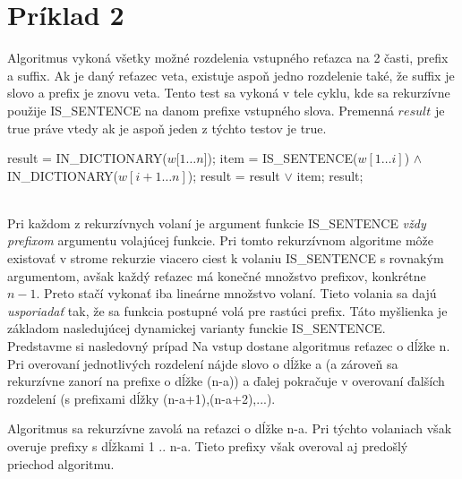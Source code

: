 \documentclass[paper=a4, fontsize=11pt]{scrartcl} %
\numberwithin{equation}{section} %
\numberwithin{figure}{section} %
\numberwithin{table}{section} %
\begin{document}
\pagebreak


\section*{Príklad 2}

Algoritmus vykoná všetky možné rozdelenia vstupného reťazca na 2 časti, prefix a suffix.
Ak je daný reťazec veta, existuje aspoň jedno rozdelenie také, že suffix je slovo a prefix je znovu veta.
Tento test sa vykoná v tele cyklu, kde sa rekurzívne použije IS\_SENTENCE na danom prefixe vstupného slova.
Premenná $result$ je true práve vtedy ak je aspoň jeden z týchto testov je true.

\begin{algorithmic}[1]
        \State result = IN\_DICTIONARY($w[1 \dots n$]);
        	\State item = IS\_SENTENCE($w[1 \dots i]$) $\wedge$ IN\_DICTIONARY($w[i + 1 \dots n]$);
		\State result = result $\vee$ item;
        \EndFor
        \State \Return result;
    \EndFunction
\end{algorithmic}
\ \\

Pri každom z rekurzívnych volaní je argument funkcie IS\_SENTENCE {\em vždy prefixom} argumentu volajúcej funkcie.
Pri tomto rekurzívnom algoritme môže existovať v strome rekurzie viacero ciest k volaniu IS\_SENTENCE s rovnakým argumentom, avšak každý reťazec má konečné množstvo prefixov, konkrétne $n - 1$.
Preto stačí vykonať iba lineárne množstvo volaní.
Tieto volania sa dajú {\em usporiadať} tak, že sa funkcia postupné volá pre rastúci prefix. 
Táto myšlienka je základom nasledujúcej dynamickej varianty funckie IS\_SENTENCE.\\

Predstavme si nasledovný prípad
Na vstup dostane algoritmus reťazec o dĺžke n.
Pri overovaní jednotlivých rozdelení nájde slovo o dĺžke a (a zároveň sa rekurzívne zanorí na prefixe o dĺžke (n-a)) a ďalej pokračuje v overovaní ďalších rozdelení (s prefixami dĺžky (n-a+1),(n-a+2),...).

Algoritmus sa rekurzívne zavolá na reťazci o dĺžke n-a.
Pri týchto volaniach však overuje prefixy s dĺžkami 1 .. n-a. Tieto prefixy však overoval aj predošlý priechod algoritmu.
\end{document}
